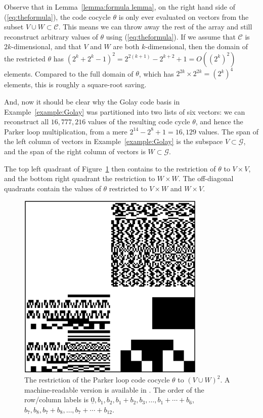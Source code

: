 \documentclass{article}
\theoremstyle{plain}
\theoremstyle{definition}
\def \cC {\mathcal{C}}
\def \cG {\mathcal{G}}
\begin{document}
Observe that in Lemma~\ref{lemma:formula lemma}, on the right hand side of (\ref{eq:theformula}), the code cocycle $\theta$ is only ever evaluated on vectors from the subset $V \cup W \subset \cC$.
This means we can throw away the rest of the array and still reconstruct arbitrary values of $\theta$ using (\ref{eq:theformula}).
If we assume that $\cC$ is $2k$-dimensional, and that $V$ and $W$ are both $k$-dimensional, then the domain of the restricted $\theta$ has $(2^k+2^k - 1)^2 = 2^{2(k+1)} - 2^{k+2} + 1 = O((2^k)^2)$ elements. 
Compared to the full domain of $\theta$, which has $2^{2k}\times 2^{2k} = (2^k)^4$ elements, this is roughly a square-root saving.

And, now it should be clear why the Golay code basis in Example~\ref{example:Golay} was partitioned into two lists of six vectors: we can reconstruct all $16,777,216$ values of the resulting code cycle $\theta$, and hence the Parker loop multiplication, from a mere $2^{14} - 2^8 + 1 = 16,129$ values.
The span of the left column of vectors in Example~\ref{example:Golay} is the subspace $V\subset \cG$, and the span of the right column of vectors is $W\subset \cG$.

The top left quadrant of Figure~\ref{fig:Parker cocycle} then contains to the restriction of $\theta$ to $V\times V$, and the bottom right quadrant the restriction to $W\times W$. 
The off-diagonal quadrants contain the values of $\theta$ restricted to $V\times W$ and $W\times V$.

\begin{figure}[ht]
\begin{center}
\includegraphics[width=0.8\textwidth]{alpha_awesum.png}
\end{center}
\caption{The restriction of the Parker loop code cocycle $\theta$ to $(V\cup W)^2$. A machine-readable version is available in \cite{RN_GH}. The order of the row/column labels is $\underline{0},b_1,b_2,b_1+b_2,b_3,\ldots, b_1+\cdots +b_6$, $b_7,b_8,b_7+b_8,\ldots,b_7+\cdots + b_{12}$.}
\label{fig:Parker cocycle}
\end{figure}
\end{document}
